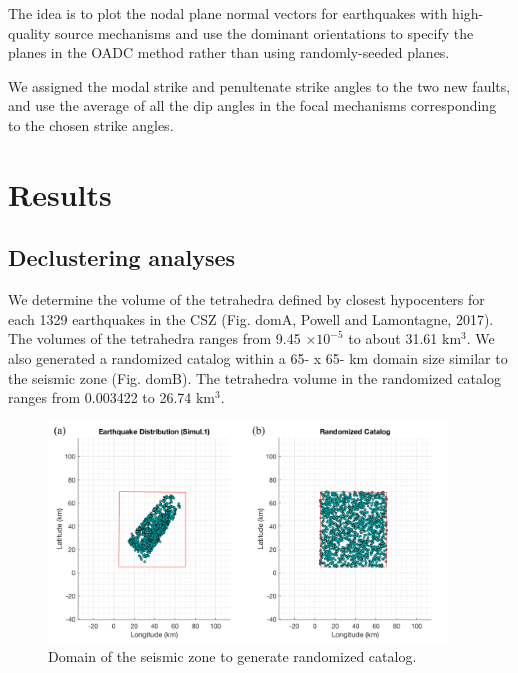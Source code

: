\documentclass[draft]{agujournal2018}
\begin{document}
The idea is to plot the nodal plane normal vectors for earthquakes with high-quality source mechanisms and use the dominant orientations to specify the planes in the OADC method rather than using randomly-seeded planes. 





We assigned the modal strike and penultenate strike angles to the two new faults, and use the average of all the dip angles in the focal mechanisms corresponding to the chosen strike angles. 







\section{Results}

\subsection{Declustering analyses}
We determine the volume of the tetrahedra defined by closest hypocenters for each 1329 earthquakes in the CSZ (Fig. domA, Powell and Lamontagne, 2017). The volumes of the tetrahedra ranges from 9.45 $\times 10^{-5}$ to about 31.61 km$^{3}$. We also generated a randomized catalog within a  65- x 65- km domain size similar to the seismic zone (Fig. domB). The tetrahedra volume in the randomized catalog ranges from 0.003422 to 26.74 km$^{3}$.

\begin{figure}[ht]
\centering
\includegraphics[width=25pc]{Figures/domain_cum_only.png}
\caption{Domain of the seismic zone to generate randomized catalog.}
\label{figfive}
\end{figure}
\end{document}
